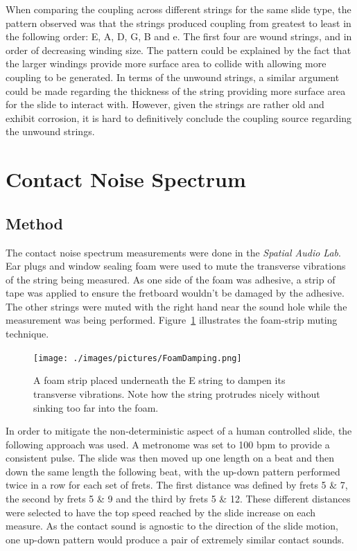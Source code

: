 \documentclass[../main.tex]{subfiles}
\begin{document}
When comparing the coupling across different strings for the same slide type, the pattern observed was that the strings produced coupling from greatest to least in the following order: E, A, D, G, B and e. The first four are wound strings, and in order of decreasing winding size. The pattern could be explained by the fact that the larger windings provide more surface area to collide with allowing more coupling to be generated. In terms of the unwound strings, a similar argument could be made regarding the thickness of the string providing more surface area for the slide to interact with. However, given the strings are rather old and exhibit corrosion, it is hard to definitively conclude the coupling source regarding the unwound strings.

\section{Contact Noise Spectrum}
\subsection{Method}
The contact noise spectrum measurements were done in the \emph{Spatial Audio Lab}. Ear plugs and window sealing foam were used to mute the transverse vibrations of the string being measured. As one side of the foam was adhesive, a strip of tape was applied to ensure the fretboard wouldn't be damaged by the adhesive. The other strings were muted with the right hand near the sound hole while the measurement was being performed. Figure~\ref{fig:FoamStrip} illustrates the foam-strip muting technique.

\begin{figure}[h]
    \centering
    \texttt{[image: ./images/pictures/FoamDamping.png]}
    \caption{A foam strip placed underneath the E string to dampen its transverse vibrations. Note how the string protrudes nicely without sinking too far into the foam.}
    \label{fig:FoamStrip}
\end{figure}

In order to mitigate the non-deterministic aspect of a human controlled slide, the following approach was used. A metronome was set to 100 bpm to provide a consistent pulse. The slide was then moved up one length on a beat and then down the same length the following beat, with the up-down pattern performed twice in a row for each set of frets. The first distance was defined by frets 5 \& 7, the second by frets 5 \& 9 and the third by frets 5 \& 12. These different distances were selected to have the top speed reached by the slide increase on each measure. As the contact sound is agnostic to the direction of the slide motion, one up-down pattern would produce a pair of extremely similar contact sounds.
\end{document}
